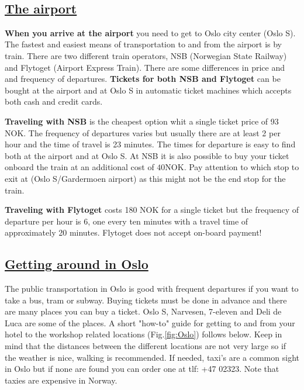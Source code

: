 \documentclass{article}
\begin{document}
\begin{center}
\begin{changemargin}{-1cm}{-1cm}
\begin{tikzpicture}[node distance=-1pt, auto]
\end{tikzpicture}
\end{changemargin}
\end{center}

\clearpage

\
\subsection*{\underline{The airport}}

\textbf{When you arrive at the airport} you need to
get to Oslo city center (Oslo S).
The fastest and easiest means of transportation to and from the airport
is by train. There are two different train operators, NSB
(Norwegian State Railway) and Flytoget (Airport Express Train).
There are some differences in price and
 and frequency of departures.
\textbf{Tickets for both NSB and Flytoget} can be bought at the airport
and at Oslo S in automatic ticket machines which accepts both cash
and credit cards.

\textbf{Traveling with NSB} is the cheapest
option whit a single ticket price
of 93 NOK. The frequency of departures varies but
usually there are at least 2 per hour and the time of travel is 23
 minutes. The times for departure is easy to find
both at the airport and at Oslo S.
At NSB it is also possible to buy your ticket
onboard the train at an additional cost of $40$NOK.
Pay attention to which stop to exit at (Oslo S/Gardermoen airport)
as this might not be the end stop for the train.

\textbf{Traveling with Flytoget} costs 180 NOK for a single ticket
but the frequency of departure per hour is 6, one every
ten minutes with a travel time of approximately 20 minutes.
Flytoget does not accept on-board payment!


\subsection*{\underline{Getting around in Oslo}}

The public transportation in Oslo is good with frequent
departures if you want
to take a bus, tram or subway. Buying tickets must be
done in advance and there are many places you can buy a
ticket. Oslo S, Narvesen, 7-eleven and Deli de Luca are some of the places.
A short "how-to" guide for getting to and from your hotel
 to the workshop related
locations (Fig.\ref{fig:Oslo}) follows below. Keep in mind that
the distances
between the different locations are not very large so if the
weather is nice, walking is recommended. If needed, taxi's
are a common sight in Oslo but if none are found you can order one
at tlf: +47 02323. Note that taxies are expensive in Norway.
\end{document}
